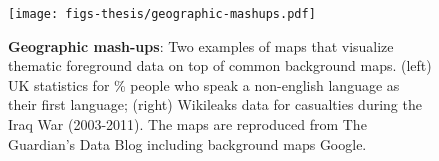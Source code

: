 \documentclass[11pt, oneside]{report}
\begin{document}
{\begin{figure}[htbp]
\begin{center}
\texttt{[image: figs-thesis/geographic-mashups.pdf]}
\caption{\textbf{Geographic mash-ups}: Two examples of maps that visualize thematic foreground data on top of common background maps. (left) UK statistics for \% people who speak a non-english language as their first language; (right) Wikileaks data for casualties during the Iraq War (2003-2011). The maps are reproduced from The Guardian's Data Blog including background maps  Google.}
\label{fig:introduction:background:mashups}
\end{center}
\vspace*{-4ex}
\end{figure}



}
\end{document}
